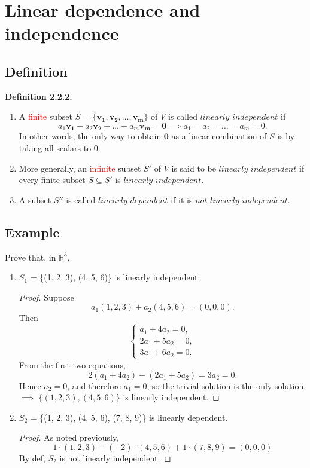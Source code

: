 \documentclass[12pt]{article}
\begin{document}
\newpage

\section{Linear dependence and independence}

\subsection{Definition}
\textbf{Definition 2.2.2.}
\begin{enumerate}
    \item A \textcolor{red}{finite} subset $S$ = $\{\mathbf{v_1},\mathbf{v_2},\ldots,\mathbf{v_m}\}$ of $V$ is called $linearly$ $independent$ if
    \[
        a_1\mathbf{v_1} + a_2\mathbf{v_2} + \ldots + a_m\mathbf{v_m} = \mathbf{0} \implies a_1 = a_2 = \ldots = a_m = 0.
    \]   In other words, the only way to obtain $\mathbf{0}$ as a linear combination of $S$ is by taking all scalars to 0.

    \item More generally, an \textcolor{red}{infinite} subset $S'$ of $V$ is said to be $linearly$ $independent$ if every finite subset $S \subseteq S'$ is $linearly$ $independent$.

    \item A subset $S''$ is called $linearly$ $dependent$ if it is $not$ $linearly$ $independent$.

\end{enumerate}

\subsection{Example}

Prove that, in $\mathbb{R}^3$,

\begin{enumerate}
    \item $S_1$ = \{(1, 2, 3), (4, 5, 6)\} is linearly independent:
    \begin{proof}
        Suppose
        \[
        a_1(1,2,3) + a_2(4,5,6) = (0,0,0).
        \]
        Then
        \[
        \begin{cases}
        a_1 + 4a_2 = 0,\\
        2a_1 + 5a_2 = 0,\\
        3a_1 + 6a_2 = 0.
        \end{cases}
        \]
        From the first two equations,
        \[
        2(a_1+4a_2)-(2a_1+5a_2) = 3a_2 = 0.
        \]
        Hence $a_2 = 0$, and therefore $a_1 = 0$, so the trivial solution is the only solution.\\
        $\implies$ $\{(1,2,3),(4,5,6)\}$ is linearly independent.
    \end{proof}
    \item $S_2$ = \{(1, 2, 3), (4, 5, 6), (7, 8, 9)\} is linearly dependent.  
        \begin{proof}
            As noted previously, 
            \[
                1 \cdot (1, 2, 3) + (-2) \cdot (4, 5, 6) + 1 \cdot (7, 8, 9) = (0, 0, 0)
            \] By def, $S_2$ is not linearly independent.
        \end{proof}
\end{enumerate}
\end{document}
